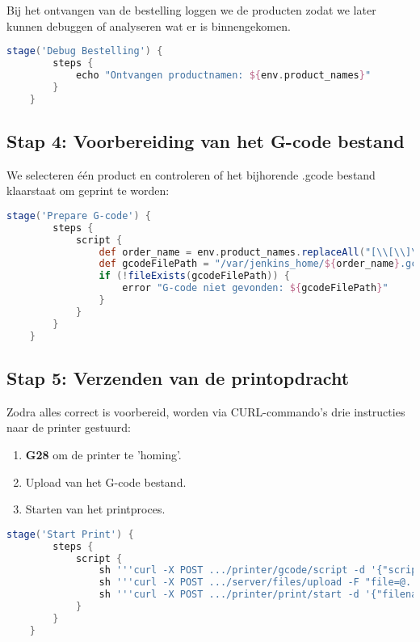 \begin{enumerate}
Bij het ontvangen van de bestelling loggen we de producten zodat we later kunnen debuggen of analyseren wat er is binnengekomen.

\begin{lstlisting}[language=groovy, caption=Debugging van de ontvangen productnamen]
    stage('Debug Bestelling') {
        steps {
            echo "Ontvangen productnamen: ${env.product_names}"
        }
    }
\end{lstlisting}

\subsection*{Stap 4: Voorbereiding van het G-code bestand}

We selecteren één product en controleren of het bijhorende .gcode bestand klaarstaat om geprint te worden:

\begin{lstlisting}[language=groovy, caption=Controleren van G-code beschikbaarheid]
    stage('Prepare G-code') {
        steps {
            script {
                def order_name = env.product_names.replaceAll("[\\[\\]\" ]", "").split(",")[0]
                def gcodeFilePath = "/var/jenkins_home/${order_name}.gcode"
                if (!fileExists(gcodeFilePath)) {
                    error "G-code niet gevonden: ${gcodeFilePath}"
                }
            }
        }
    }
\end{lstlisting}

\subsection*{Stap 5: Verzenden van de printopdracht}

Zodra alles correct is voorbereid, worden via CURL-commando’s drie instructies naar de printer gestuurd:

\begin{enumerate}
    \item \textbf{G28} om de printer te 'homing'.
    \item Upload van het G-code bestand.
    \item Starten van het printproces.
\end{enumerate}

\begin{lstlisting}[language=groovy, caption=Starten van het printproces via curl]
    stage('Start Print') {
        steps {
            script {
                sh '''curl -X POST .../printer/gcode/script -d '{"script": "G28"}' '''
                sh '''curl -X POST .../server/files/upload -F "file=@..." '''
                sh '''curl -X POST .../printer/print/start -d '{"filename": "..."}' '''
            }
        }
    }
\end{lstlisting}



\end{enumerate}
